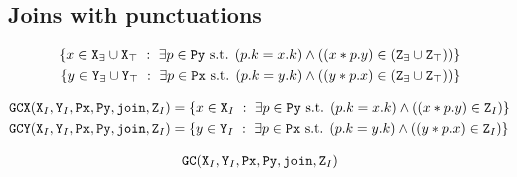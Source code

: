 \documentclass[10pt]{proc}
\numberwithin{equation}{section}
\renewcommand{\tt}[1]{\ifmmode\text{\texttt{#1}}\else\texttt{#1}\fi}
\begin{document}
\subsection{Joins with punctuations}

\begin{align*}
\{x \in \tt{X}_\exists \cup \tt{X}_\top ~:~ \exists p \in \tt{Py} \text{ s.t. } (p.k = x.k) \wedge ((x \ast p.y) \in (\tt{Z}_\exists \cup \tt{Z}_\top))\}\\
\{y \in \tt{Y}_\exists \cup \tt{Y}_\top ~:~ \exists p \in \tt{Px} \text{ s.t. } (p.k = y.k) \wedge ((y \ast p.x) \in (\tt{Z}_\exists \cup \tt{Z}_\top))\}\\
\end{align*}

\begin{align*}
\tt{GCX}(\tt{X}_I, \tt{Y}_I, \tt{Px}, \tt{Py}, \tt{join}, \tt{Z}_I) &= \{x \in \tt{X}_I ~:~ \exists p \in \tt{Py} \text{ s.t. } (p.k = x.k) \wedge ((x \ast p.y) \in \tt{Z}_I)\}\\
\tt{GCY}(\tt{X}_I, \tt{Y}_I, \tt{Px}, \tt{Py}, \tt{join}, \tt{Z}_I) &= \{y \in \tt{Y}_I ~:~ \exists p \in \tt{Px} \text{ s.t. } (p.k = y.k) \wedge ((y \ast p.x) \in \tt{Z}_I)\}\\
\end{align*}

\begin{align*}
\tt{GC}(\tt{X}_I, \tt{Y}_I, \tt{Px}, \tt{Py}, \tt{join}, \tt{Z}_I)
\end{align*}





\newpage
\balance





\end{document}
